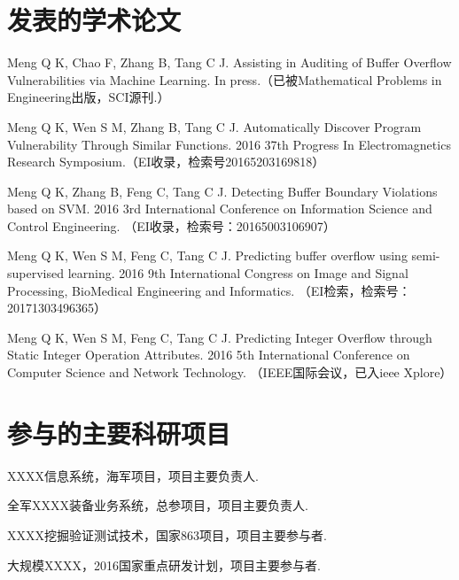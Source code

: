 \begin{resume}

  \section*{发表的学术论文} %

  \begin{enumerate}[{[}1{]}]
  \item Meng Q K, Chao F, Zhang B, Tang C J. Assisting in Auditing of Buffer Overflow Vulnerabilities via Machine Learning. In press.（已被Mathematical Problems in Engineering出版，SCI源刊.）
  
  \item Meng Q K, Wen S M, Zhang B, Tang C J. Automatically Discover Program Vulnerability Through Similar Functions. 2016 37th Progress In Electromagnetics Research Symposium.（EI收录，检索号20165203169818）
  
  \item Meng Q K, Zhang B, Feng C, Tang C J. Detecting Buffer Boundary Violations based on SVM. 2016 3rd International Conference on Information Science and Control Engineering. （EI收录，检索号：20165003106907）
  
  \item Meng Q K, Wen S M, Feng C, Tang C J. Predicting buffer overflow using semi-supervised
  learning. 2016 9th International Congress on Image and Signal Processing, BioMedical Engineering and Informatics. （EI检索，检索号：20171303496365）
  
  \item Meng Q K, Wen S M, Feng C, Tang C J. Predicting Integer Overflow through Static Integer Operation Attributes. 2016 5th International Conference on Computer Science and Network Technology. （IEEE国际会议，已入ieee Xplore）
  
  
  \end{enumerate}

  \section*{参与的主要科研项目} %
  \begin{enumerate}[{[}1{]}]
  \addtolength{\itemsep}{-.36\baselineskip}%
  \item XXXX信息系统，海军项目，项目主要负责人.
  \item 全军XXXX装备业务系统，总参项目，项目主要负责人.
  \item XXXX挖掘验证测试技术，国家863项目，项目主要参与者.
  \item 大规模XXXX，2016国家重点研发计划，项目主要参与者.
  \end{enumerate}
\end{resume}
